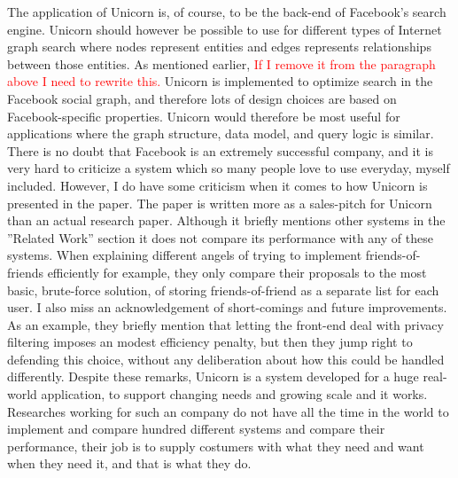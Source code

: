 \documentclass{article}
\begin{document}
\noindent The application of Unicorn is, of course, to be the back-end of Facebook's search engine. Unicorn should however be possible to use for different types of Internet graph search where nodes represent entities and edges represents relationships between those entities. As mentioned earlier, \textcolor{red}{If I remove it from the paragraph above I need to rewrite this.} Unicorn is implemented to optimize search in the Facebook social graph, and therefore lots of design choices are based on Facebook-specific properties. Unicorn would therefore be most useful for applications where the graph structure, data model, and query logic is similar. \\

\noindent There is no doubt that Facebook is an extremely successful company, and it is very hard to criticize a system which so many people love to use everyday, myself included. However, I do have some criticism when it comes to how Unicorn is presented in the paper. The paper is written more as a sales-pitch for Unicorn than an actual research paper. Although it briefly mentions other systems in the ''Related Work'' section it does not compare its performance with any of these systems. When explaining different angels of trying to implement friends-of-friends efficiently for example, they only compare their proposals to the most basic, brute-force solution, of storing friends-of-friend as a separate list for each user. I also miss an acknowledgement of short-comings and future improvements. As an example, they briefly mention that letting the front-end deal with privacy filtering imposes an modest efficiency penalty, but then they jump right to defending this choice, without any deliberation about how this could be handled differently. Despite these remarks, Unicorn is a system developed for a huge real-world application, to support changing needs and growing scale and it works. Researches working for such an company do not have all the time in the world to implement and compare hundred different systems and compare their performance, their job is to supply costumers with what they need and want when they need it, and that is what they do.
\end{document}
